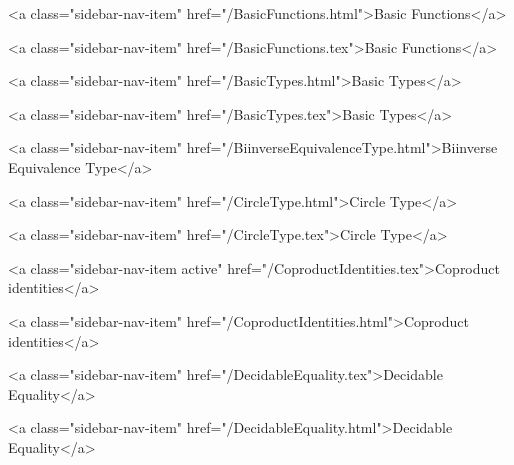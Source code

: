       
    
      
        
          <a class="sidebar-nav-item" href="/BasicFunctions.html">Basic Functions</a>
        
      
    
      
        
          <a class="sidebar-nav-item" href="/BasicFunctions.tex">Basic Functions</a>
        
      
    
      
        
          <a class="sidebar-nav-item" href="/BasicTypes.html">Basic Types</a>
        
      
    
      
        
          <a class="sidebar-nav-item" href="/BasicTypes.tex">Basic Types</a>
        
      
    
      
        
          <a class="sidebar-nav-item" href="/BiinverseEquivalenceType.html">Biinverse Equivalence Type</a>
        
      
    
      
        
          <a class="sidebar-nav-item" href="/CircleType.html">Circle Type</a>
        
      
    
      
        
          <a class="sidebar-nav-item" href="/CircleType.tex">Circle Type</a>
        
      
    
      
        
          <a class="sidebar-nav-item active" href="/CoproductIdentities.tex">Coproduct identities</a>
        
      
    
      
        
          <a class="sidebar-nav-item" href="/CoproductIdentities.html">Coproduct identities</a>
        
      
    
      
        
          <a class="sidebar-nav-item" href="/DecidableEquality.tex">Decidable Equality</a>
        
      
    
      
        
          <a class="sidebar-nav-item" href="/DecidableEquality.html">Decidable Equality</a>
        
